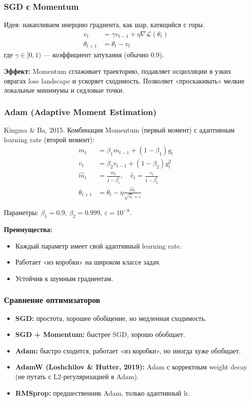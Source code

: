 \documentclass[a4paper,12pt]{article}
\begin{document}
\subsubsection{SGD с Momentum}

Идея: накапливаем инерцию градиента, как шар, катящийся с горы.
\[
\begin{aligned}
v_t &= \gamma v_{t-1} + \eta \nabla \mathcal{L}(\theta_t) \\
\theta_{t+1} &= \theta_t - v_t
\end{aligned}
\]
где $\gamma \in [0, 1)$ — коэффициент затухания (обычно 0.9).

\textbf{Эффект:} Momentum сглаживает траекторию, подавляет осцилляции в узких оврагах loss landscape и ускоряет сходимость. Позволяет «проскакивать» мелкие локальные минимумы и седловые точки.

\subsubsection{Adam (Adaptive Moment Estimation)}

Kingma \& Ba, 2015. Комбинация Momentum (первый момент) с адаптивным learning rate (второй момент):
\[
\begin{aligned}
m_t &= \beta_1 m_{t-1} + (1-\beta_1) g_t \\
v_t &= \beta_2 v_{t-1} + (1-\beta_2) g_t^2 \\
\hat{m}_t &= \frac{m_t}{1 - \beta_1^t}, \quad \hat{v}_t = \frac{v_t}{1 - \beta_2^t} \\
\theta_{t+1} &= \theta_t - \eta \frac{\hat{m}_t}{\sqrt{\hat{v}_t} + \varepsilon}
\end{aligned}
\]

Параметры: $\beta_1 = 0.9$, $\beta_2 = 0.999$, $\varepsilon = 10^{-8}$.

\textbf{Преимущества:}
\begin{itemize}
    \item Каждый параметр имеет свой адаптивный learning rate.
    \item Работает «из коробки» на широком классе задач.
    \item Устойчив к шумным градиентам.
\end{itemize}

\subsubsection{Сравнение оптимизаторов}

\begin{itemize}
    \item \textbf{SGD:} простота, хорошее обобщение, но медленная сходимость.
    \item \textbf{SGD + Momentum:} быстрее SGD, хорошо обобщает.
    \item \textbf{Adam:} быстро сходится, работает «из коробки», но иногда хуже обобщает.
    \item \textbf{AdamW (Loshchilov \& Hutter, 2019):} Adam с корректным weight decay (не путать с L2-регуляризацией в Adam).
    \item \textbf{RMSprop:} предшественник Adam, только адаптивный lr.
\end{itemize}
\end{document}
